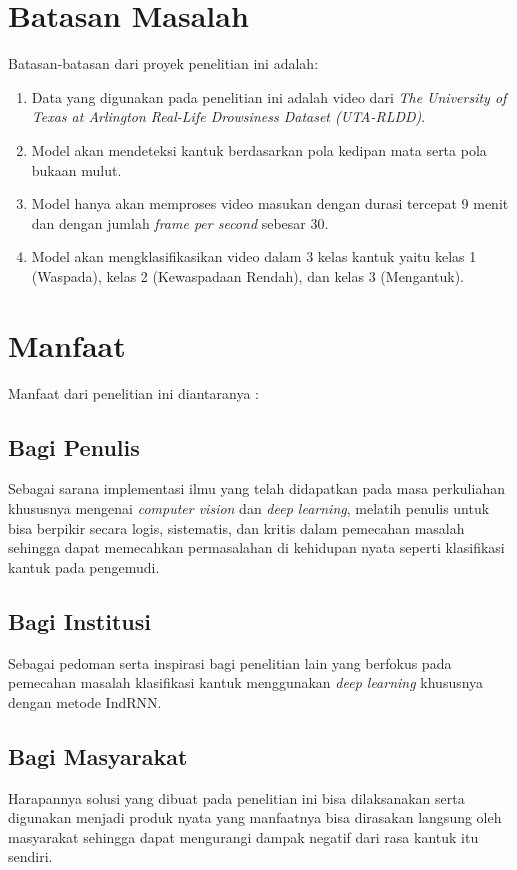 \section{Batasan Masalah}
\label{sec:batasanmasalah}

Batasan-batasan dari proyek penelitian ini adalah:

\begin{enumerate}[nolistsep]

      \item Data yang digunakan pada penelitian ini adalah video
            dari \emph{The University of Texas at Arlington Real-Life Drowsiness Dataset (UTA-RLDD)}.

      \item Model akan mendeteksi kantuk berdasarkan pola kedipan
            mata serta pola bukaan mulut.

      \item Model hanya akan memproses video masukan dengan durasi
            tercepat 9 menit dan dengan jumlah \emph{frame per second}
            sebesar 30.

      \item Model akan mengklasifikasikan video dalam 3 kelas kantuk
            yaitu kelas 1 (Waspada), kelas 2 (Kewaspadaan Rendah),
            dan kelas 3 (Mengantuk).

\end{enumerate}

\section{Manfaat}

Manfaat dari penelitian ini diantaranya :
\subsection{Bagi Penulis}
Sebagai sarana implementasi ilmu yang telah didapatkan pada masa
perkuliahan khususnya mengenai \emph{computer vision} dan \emph{deep learning}, melatih penulis untuk bisa
berpikir secara logis, sistematis, dan kritis dalam pemecahan masalah sehingga dapat
memecahkan permasalahan di kehidupan nyata seperti klasifikasi kantuk pada pengemudi.
\subsection{Bagi Institusi}
Sebagai pedoman serta inspirasi bagi penelitian lain yang
berfokus pada pemecahan masalah klasifikasi kantuk menggunakan \emph{deep learning} khususnya dengan
metode IndRNN.
\subsection{Bagi Masyarakat}
Harapannya solusi yang dibuat pada penelitian ini bisa dilaksanakan serta digunakan
menjadi produk nyata yang manfaatnya bisa dirasakan langsung oleh masyarakat sehingga dapat
mengurangi dampak negatif dari rasa kantuk itu sendiri.
